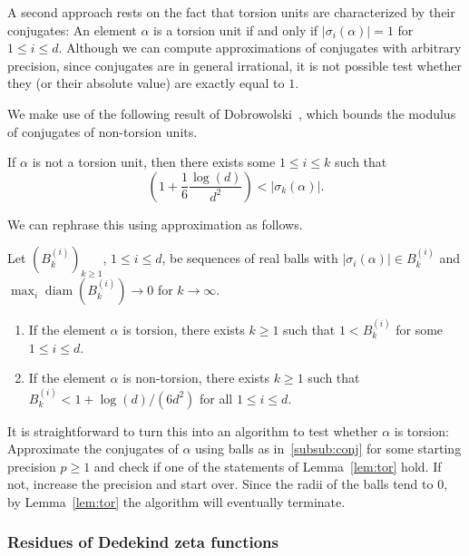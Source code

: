 \documentclass{sig-alternate-05-2015}
\begin{document}
A second approach rests on the fact that torsion units are characterized by their conjugates: An element
$\alpha$ is a torsion unit if and only if $\lvert \sigma_i(\alpha) \rvert = 1$ for $1 \leq i \leq d$.
Although we can compute approximations of conjugates with arbitrary precision, since conjugates are in general
irrational, it is not possible test whether they (or their absolute value) are exactly equal to $1$.

We make use of the following result of Dobrowolski~\cite{Dobrowolski1978}, which bounds the modulus of conjugates of non-torsion units.

\begin{lemma}
If $\alpha$ is not a torsion unit, then there exists some $1 \leq i \leq k$ such that
\[ \left(1 + \frac 1 6 \frac{\log(d)}{d^2} \right) < \lvert \sigma_k(\alpha) \rvert. \]
\end{lemma}

We can rephrase this using approximation as follows.

\begin{lemma}\label{lem:tor}
  Let $(B^{(i)}_k)_{k \geq 1}$, $1 \leq i \leq d$, be sequences of real balls with $\lvert \sigma_i(\alpha) \rvert \in B^{(i)}_k$ and $\max_i\operatorname{diam}(B_k^{(i)}) \to 0$ for $k \to \infty$.
  \begin{enumerate}
  \item
    If the element $\alpha$ is torsion, there exists $k \geq 1$ such that $1 < B_k^{(i)}$ for some $1 \leq i \leq d$.
  \item
    If the element $\alpha$ is non-torsion, there exists $k \geq 1$ such that $B_k^{(i)} < 1 + \log(d)/(6d^2)$ for all $1 \leq i \leq d$.
  \end{enumerate}
\end{lemma}

It is straightforward to turn this into an algorithm to test whether $\alpha$ is torsion: Approximate the conjugates of $\alpha$ using balls
as in~\ref{subsub:conj} for some starting precision $p \geq 1$ and check if one of the statements of Lemma~\ref{lem:tor} hold.
If not, increase the precision and start over.
Since the radii of the balls tend to $0$, by Lemma~\ref{lem:tor} the algorithm will eventually terminate.

\subsubsection{Residues of Dedekind zeta functions}
\end{document}
